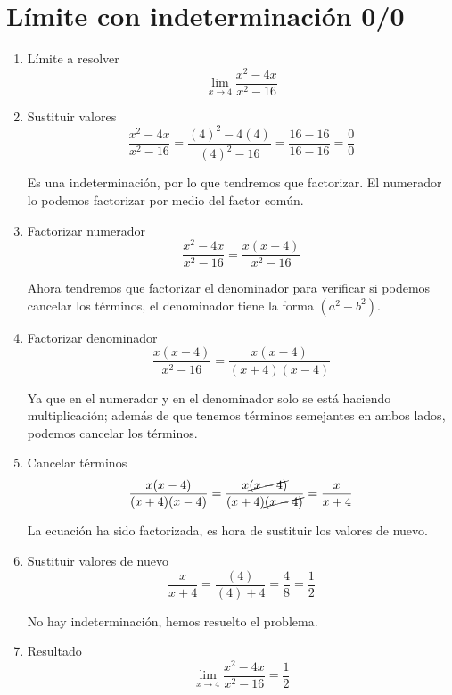 \documentclass[a4paper,10pt]{article}
\begin{document}
\newpage

\section{Límite con indeterminación 0/0}
\begin{enumerate}
	\item Límite a resolver
	      \[
		      \lim_{x\to4}\frac{x^{2} - 4x}{x^{2} - 16}
	      \]

	\item Sustituir valores
	      \[
		      \frac{x^{2} - 4x}{x^{2} - 16} = \frac{(4)^{2} - 4(4)}{(4)^{2} - 16} = \frac{16 - 16}{16 - 16} = \frac{0}{0}
	      \]

	      Es una indeterminación, por lo que tendremos que factorizar. El numerador lo podemos factorizar por medio del factor común.

	\item Factorizar numerador
	      \[
		      \frac{x^{2} - 4x}{x^{2} - 16} = \frac{x(x - 4)}{x^{2} - 16}
	      \]

	      Ahora tendremos que factorizar el denominador para verificar si podemos cancelar los términos, el denominador tiene la forma $(a^{2} - b^{2})$.

	\item Factorizar denominador
	      \[
		      \frac{x(x - 4)}{x^{2} - 16} = \frac{x(x - 4)}{(x + 4)(x - 4)}
	      \]

	      Ya que en el numerador y en el denominador solo se está haciendo multiplicación; además de que tenemos términos semejantes en ambos lados, podemos cancelar los términos.

	\item Cancelar términos
	      \[
		      \frac{x(x - 4)}{(x + 4)(x - 4)} = \frac{x\cancel{(x - 4)}}{(x + 4)\cancel{(x - 4)}} = \frac{x}{x + 4}
	      \]

	      La ecuación ha sido factorizada, es hora de sustituir los valores de nuevo.

	\item Sustituir valores de nuevo
	      \[
		      \frac{x}{x + 4} = \frac{(4)}{(4) + 4} = \frac{4}{8} = \frac{1}{2}
	      \]

	      No hay indeterminación, hemos resuelto el problema.

	\item Resultado
	      \[
		      \boxed{\lim_{x\to4}\frac{x^{2} - 4x}{x^{2} - 16} = \frac{1}{2}}
	      \]
\end{enumerate}
\end{document}
